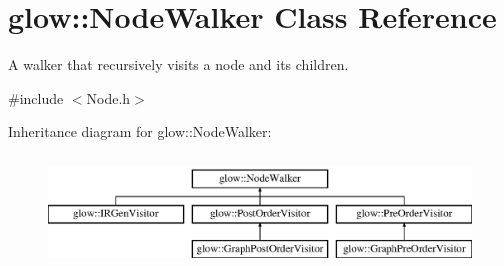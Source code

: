 \hypertarget{classglow_1_1_node_walker}{}\section{glow\+:\+:Node\+Walker Class Reference}
\label{classglow_1_1_node_walker}


A walker that recursively visits a node and its children.  




{\ttfamily \#include $<$Node.\+h$>$}

Inheritance diagram for glow\+:\+:Node\+Walker\+:\begin{figure}[H]
\begin{center}
\leavevmode
\includegraphics[height=3.000000cm]{classglow_1_1_node_walker}
\end{center}
\end{figure}
